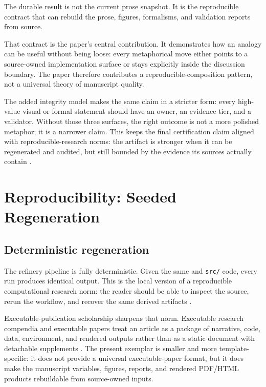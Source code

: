 \documentclass[
]{article}
\begin{document}
The durable result is not the current prose snapshot. It is the
reproducible contract that can rebuild the prose, figures, formalisms,
and validation reports from source.

That contract is the paper's central contribution. It demonstrates how
an analogy can be useful without being loose: every metaphorical move
either points to a source-owned implementation surface or stays
explicitly inside the discussion boundary. The paper therefore
contributes a reproducible-composition pattern, not a universal theory
of manuscript quality.

The added integrity model makes the same claim in a stricter form: every
high-value visual or formal statement should have an owner, an evidence
tier, and a validator. Without those three surfaces, the right outcome
is not a more polished metaphor; it is a narrower claim. This keeps the
final certification claim aligned with reproducible-research norms: the
artifact is stronger when it can be regenerated and audited, but still
bounded by the evidence its sources actually contain
\citep{sandve2013ten, marwick2018packaging}.

\newpage

\section{Reproducibility: Seeded
Regeneration}\label{sec:reproducibility}

\subsection{Deterministic
regeneration}\label{deterministic-regeneration}

The refinery pipeline is fully deterministic. Given the same
 and \texttt{src/} code, every run
produces identical output. This is the local version of a reproducible
computational research norm: the reader should be able to inspect the
source, rerun the workflow, and recover the same derived artifacts
\citep{peng2011reproducible, sandve2013ten}.

Executable-publication scholarship sharpens that norm. Executable
research compendia and executable papers treat an article as a package
of narrative, code, data, environment, and rendered outputs rather than
as a static document with detachable supplements
\citep{nuest2017erc, lasser2020executable}. The present exemplar is
smaller and more template-specific: it does not provide a universal
executable-paper format, but it does make the manuscript variables,
figures, reports, and rendered PDF/HTML products rebuildable from
source-owned inputs.
\end{document}
